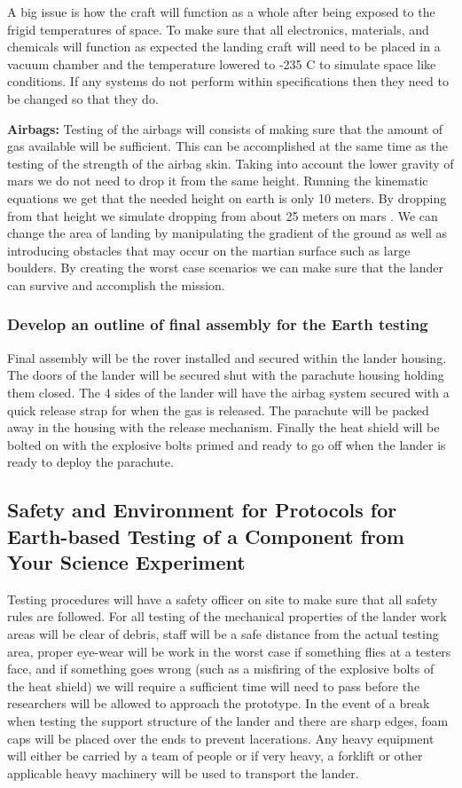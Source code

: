 \documentclass[%
 portrait,
 aapm,
 mph,%
 amsmath,amssymb,
 reprint,%
]{revtex4-2}
\begin{document}
A big issue is how the craft will function as a whole after being exposed to the frigid temperatures of space.  To make sure that all electronics, materials, and chemicals will function as expected the landing craft will need to be placed in a vacuum chamber and the temperature lowered to -235 C to simulate space like conditions.  If any systems do not perform within specifications then they need to be changed so that they do.

\textbf{Airbags: }Testing of the airbags will consists of making sure that the amount of gas available will be sufficient.  This can be accomplished at the same time as the testing of the strength of the airbag skin.  Taking into account the lower gravity of mars we do not need to drop it from the same height.  Running the kinematic equations we get that the needed height on earth is only 10 meters.  By dropping from that height we simulate dropping from about 25 meters on mars \cite{JPL:000}. We can change the area of landing by manipulating the gradient of the ground as well as introducing obstacles that may occur on the martian surface such as large boulders.  By creating the worst case scenarios we can make sure that the lander can survive and accomplish the mission.



\subsubsection{Develop an outline of final assembly for the Earth testing}
Final assembly will be the rover installed and secured within the lander housing.  The doors of the lander will be secured shut with the parachute housing holding them closed.  The 4 sides of the lander will have the airbag system secured with a quick release strap for when the gas is released.  The parachute will be packed away in the housing with the release mechanism.  Finally the heat shield will be bolted on with the explosive bolts primed and ready to go off when the lander is ready to deploy the parachute.

\subsection{Safety and Environment for Protocols for Earth-based Testing of a Component from Your Science Experiment}
Testing procedures will have a safety officer on site to make sure that all safety rules are followed.  For all testing of the mechanical properties of the lander work areas will be clear of debris, staff will be a safe distance from the actual testing area, proper eye-wear will be work in the worst case if something flies at a testers face, and if something goes wrong (such as a misfiring of the explosive bolts of the heat shield) we will require a sufficient time will need to pass before the researchers will be allowed to approach the prototype.  In the event of a break when testing the support structure of the lander and there are sharp edges, foam caps will be placed over the ends to prevent lacerations.  Any heavy equipment will either be carried by a team of people or if very heavy, a forklift or other applicable heavy machinery will be used to transport the lander.
\end{document}
